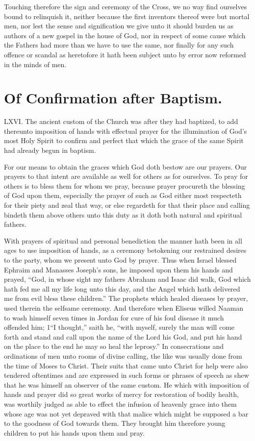 Touching therefore the sign and ceremony of the Cross, we no way find ourselves bound to relinquish it, neither because the first inventors thereof were but mortal men, nor lest the sense and signification we give unto it should burden us as authors of a new gospel in the house of God, nor in respect of some cause which the Fathers had more than we have to use the same, nor finally for any such offence or scandal as heretofore it hath been subject unto by error now reformed in the minds of men.


\section*{Of Confirmation after Baptism.}
LXVI. The ancient custom of the Church was after they had baptized, to add thereunto imposition of hands with effectual prayer for the illumination of God’s most Holy Spirit to confirm and perfect that which the grace of the same Spirit had already begun in baptism.

For our means to obtain the graces which God doth bestow are our prayers. Our prayers to that intent are available as well for others as for ourselves. To pray for others is to bless them for whom we pray, because prayer procureth the blessing of God upon them, especially the prayer of such as God either most respecteth for their piety and zeal that way, or else regardeth for that their place and calling bindeth them above others unto this duty as it doth both natural and spiritual fathers.

With prayers of spiritual and personal benediction the manner hath been in all ages to use imposition of hands, as a ceremony betokening our restrained desires to the party, whom we present unto God by prayer. Thus when Israel blessed Ephraim and Manasses Joseph’s sons, he imposed upon them his hands and prayed, “God, in whose sight my fathers Abraham and Isaac did walk, God which hath fed me all my life long unto this day, and the Angel which hath delivered me from evil bless these children.” The prophets which healed diseases by prayer, used therein the selfsame ceremony. And therefore when Eliseus willed Naaman to  wash himself seven times in Jordan for cure of his foul disease it much offended him;
 1“I thought,” saith he, “with myself, surely the man will come forth and stand and call upon the name of the Lord his God, and put his hand on the place to the end he may so heal the leprosy.” In consecrations and ordinations of men unto rooms of divine calling, the like was usually done from the time of Moses to Christ. Their suits that came unto Christ for help were also tendered oftentimes and are expressed in such forms or phrases of speech as shew that he was himself an observer of the same custom. He which with imposition of hands and prayer did so great works of mercy for restoration of bodily health, was worthily judged as able to effect the infusion of heavenly grace into them whose age was not yet depraved with that malice which might be supposed a bar to the goodness of God towards them. They brought him therefore young children to put his hands upon them and pray.

